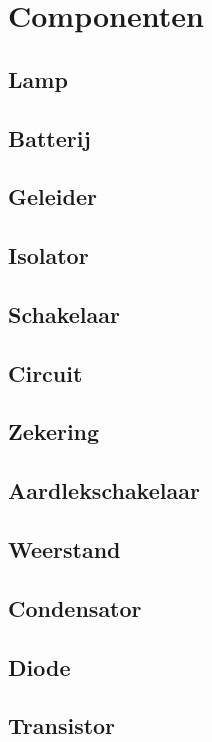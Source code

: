 \documentclass[a4paper,12pt,twoside,openright,titlepage]{book}
\begin{document}
\chapter{Componenten}

\section{Lamp}

\section{Batterij}

\section{Geleider}

\section{Isolator}

\section{Schakelaar}

\section{Circuit}

\section{Zekering}

\section{Aardlekschakelaar}
\section{Weerstand}

\section{Condensator}

\section{Diode}

\section{Transistor}

\end{document}
